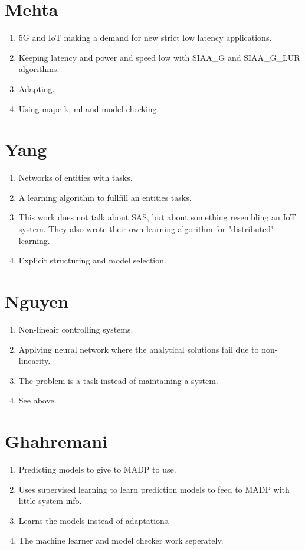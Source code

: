 \documentclass[12pt]{article}
\begin{document}
\section{Mehta}
\begin{enumerate}
    \item 5G and IoT making a demand for new strict low latency applications.
    \item Keeping latency and power and speed low with SIAA\_G and SIAA\_G\_LUR algorithms.
    \item Adapting.
    \item Using mape-k, ml and model checking.
\end{enumerate}

\section{Yang}
\begin{enumerate}
    \item Networks of entities with tasks.
    \item A learning algorithm to fullfill an entities tasks.
    \item This work does not talk about SAS, but about something resembling an IoT system. 
        They also wrote their own learning algorithm for "distributed" learning.
    \item Explicit structuring and model selection.
\end{enumerate}

\section{Nguyen}
\begin{enumerate}
    \item Non-lineair controlling systems.
    \item Applying neural network where the analytical solutions fail due to non-linearity.
    \item The problem is a task instead of maintaining a system.
    \item See above.
\end{enumerate}

\section{Ghahremani}
\begin{enumerate}
    \item Predicting models to give to MADP to use.
    \item Uses supervised learning to learn prediction models to feed to MADP with little system info.
    \item Learns the models instead of adaptations.
    \item The machine learner and model checker work seperately.
\end{enumerate}
\end{document}
